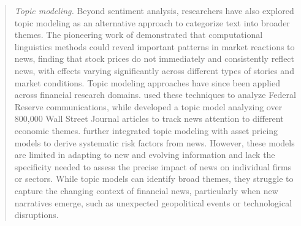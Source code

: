 \begin{quote}
\hspace{0.5cm} \textit{Topic modeling.} 
Beyond sentiment analysis, researchers have also explored topic modeling as an alternative approach to categorize text into broader themes. The pioneering work of 
\cite{antweiler2006us} %
demonstrated that computational linguistics methods could reveal important patterns in market reactions to news, finding that stock prices do not immediately and consistently reflect news, with effects varying significantly across different types of stories and market conditions. Topic modeling approaches have since been applied across financial research domains. 
\cite{hansen2018transparency} %
used these techniques to analyze Federal Reserve communications, while 
\cite{bybee2021business} %
developed a topic model analyzing over 800,000 Wall Street Journal articles to track news attention to different economic themes. 
\cite{bybee2023narrative} %
further integrated topic modeling with asset pricing models to derive systematic risk factors from news.
%
However, these models are limited in adapting to new and evolving information and lack the specificity needed to assess the precise impact of news on individual firms or sectors. While topic models can identify broad themes, they struggle to capture the changing context of financial news, particularly when new narratives emerge, such as unexpected geopolitical events or technological disruptions.


\end{quote}
